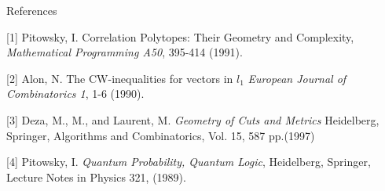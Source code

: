 {\large References}

[1] Pitowsky, I. Correlation Polytopes: Their Geometry and Complexity, {\em %
Mathematical Programming A50}, 395-414 (1991).

[2] Alon, N. The CW-inequalities for vectors in $l_{1}$ {\em European
Journal of Combinatorics 1}, 1-6 (1990).

[3] Deza, M., M., and Laurent, M. {\em Geometry of Cuts and Metrics}
Heidelberg, Springer, Algorithms and Combinatorics, Vol. 15, 587 pp.(1997)

[4] Pitowsky, I. {\em Quantum Probability, Quantum Logic}, Heidelberg,
Springer, Lecture Notes in Physics 321, (1989).


